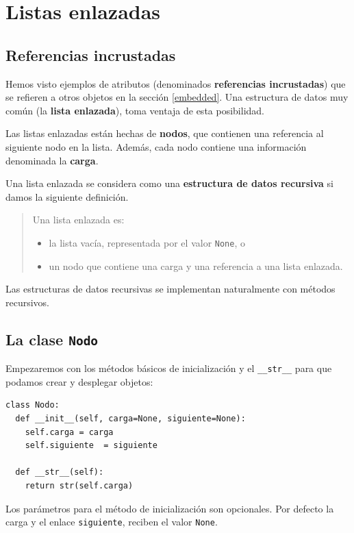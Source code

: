 
\chapter{Listas enlazadas}

\label{lista} 

\section{Referencias incrustadas}

  
   

Hemos visto ejemplos de atributos (denominados \textbf{referencias
incrustadas}) que se refieren a otros objetos en la sección \ref{embedded}.
Una estructura de datos muy común (la \textbf{lista enlazada}), toma
ventaja de esta posibilidad.

Las listas enlazadas están hechas de \textbf{nodos}, que contienen
una referencia al siguiente nodo en la lista. Además, cada nodo contiene
una información denominada la \textbf{carga}.

Una lista enlazada se considera como una \textbf{estructura de datos
recursiva} si damos la siguiente definición.
\begin{quote}
Una lista enlazada es: 

\begin{itemize}
\item la lista vacía, representada por el valor \texttt{None}, o
\item un nodo que contiene una carga y una referencia a una lista enlazada.
\end{itemize}
\end{quote}
 

Las estructuras de datos recursivas se implementan naturalmente con
métodos recursivos.

\section{La clase \texttt{Nodo} }

 

Empezaremos con los métodos básicos de inicialización y el \texttt{\_\_str\_\_}
para que podamos crear y desplegar objetos:

\beforeverb 
\begin{verbatim}
class Nodo:
  def __init__(self, carga=None, siguiente=None):
    self.carga = carga
    self.siguiente  = siguiente

  def __str__(self):
    return str(self.carga)
\end{verbatim}
\afterverb Los parámetros para el método de inicialización son opcionales.
Por defecto la carga y el enlace \texttt{siguiente}, reciben el valor
\texttt{None}.

